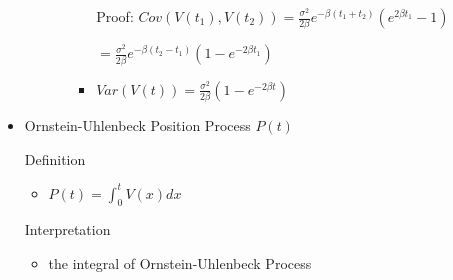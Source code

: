 \documentclass[a4paper]{article}
\begin{document}
\begin{itemize}
\begin{itemize}
\begin{itemize}
\begin{itemize}
                                Proof: $\mathit{Cov}(V(t_1), V(t_2)) = \frac{\sigma^2}{2\beta} e^{-\beta(t_1 + t_2)} (e^{2\beta t_1} - 1)$

                                $= \frac{\sigma^2}{2\beta} e^{-\beta(t_2 - t_1)} (1 - e^{-2\beta t_1})$
                            \item $\mathit{Var}(V(t)) = \frac{\sigma^2}{2\beta} (1 - e^{-2\beta t})$
                        \end{itemize}
                \end{itemize}
        \end{itemize}
    \item Ornstein-Uhlenbeck Position Process $P(t)$

        Definition
        \begin{itemize}
            \item $P(t) = \int_0^t V(x) dx$
        \end{itemize}
        Interpretation
        \begin{itemize}
            \item the integral of Ornstein-Uhlenbeck Process
        \end{itemize}
\end{itemize}
\end{document}
